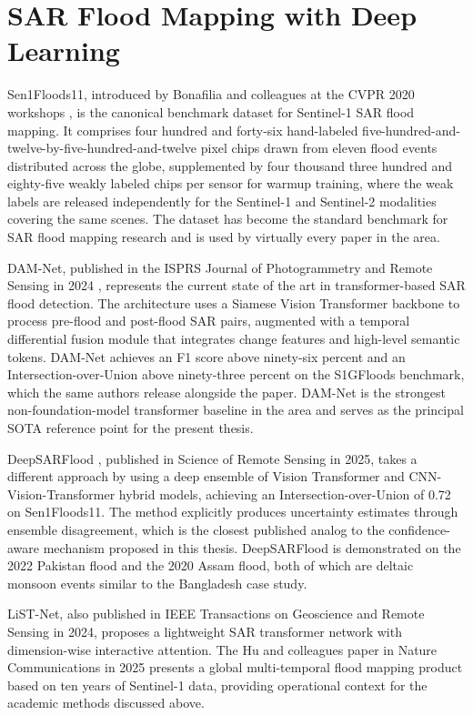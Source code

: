 \documentclass[11pt,a4paper,oneside]{report}
\begin{document}
\section{SAR Flood Mapping with Deep Learning}

Sen1Floods11, introduced by Bonafilia and colleagues at the CVPR 2020 workshops \cite{Bonafilia2020Sen1Floods11}, is the canonical benchmark dataset for Sentinel-1 SAR flood mapping. It comprises four hundred and forty-six hand-labeled five-hundred-and-twelve-by-five-hundred-and-twelve pixel chips drawn from eleven flood events distributed across the globe, supplemented by four thousand three hundred and eighty-five weakly labeled chips per sensor for warmup training, where the weak labels are released independently for the Sentinel-1 and Sentinel-2 modalities covering the same scenes. The dataset has become the standard benchmark for SAR flood mapping research and is used by virtually every paper in the area.

DAM-Net, published in the ISPRS Journal of Photogrammetry and Remote Sensing in 2024 \cite{Saleh2024DAMNet}, represents the current state of the art in transformer-based SAR flood detection. The architecture uses a Siamese Vision Transformer backbone to process pre-flood and post-flood SAR pairs, augmented with a temporal differential fusion module that integrates change features and high-level semantic tokens. DAM-Net achieves an F1 score above ninety-six percent and an Intersection-over-Union above ninety-three percent on the S1GFloods benchmark, which the same authors release alongside the paper. DAM-Net is the strongest non-foundation-model transformer baseline in the area and serves as the principal SOTA reference point for the present thesis.

DeepSARFlood \cite{Sharma2025DeepSARFlood}, published in Science of Remote Sensing in 2025, takes a different approach by using a deep ensemble of Vision Transformer and CNN-Vision-Transformer hybrid models, achieving an Intersection-over-Union of 0.72 on Sen1Floods11. The method explicitly produces uncertainty estimates through ensemble disagreement, which is the closest published analog to the confidence-aware mechanism proposed in this thesis. DeepSARFlood is demonstrated on the 2022 Pakistan flood and the 2020 Assam flood, both of which are deltaic monsoon events similar to the Bangladesh case study.

LiST-Net, also published in IEEE Transactions on Geoscience and Remote Sensing in 2024, proposes a lightweight SAR transformer network with dimension-wise interactive attention. The Hu and colleagues paper in Nature Communications in 2025 \cite{Hu2025GlobalFloods} presents a global multi-temporal flood mapping product based on ten years of Sentinel-1 data, providing operational context for the academic methods discussed above.
\end{document}
